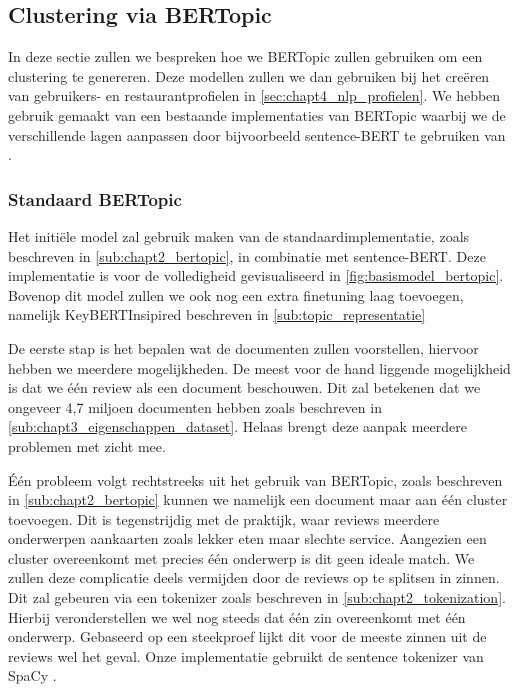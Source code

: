 
\subsection{Clustering via BERTopic}
In deze sectie zullen we bespreken hoe we BERTopic zullen gebruiken om een clustering te genereren. Deze modellen zullen we dan gebruiken bij het creëren van gebruikers- en restaurantprofielen in \autoref{sec:chapt4_nlp_profielen}. We hebben gebruik gemaakt van een bestaande implementaties van BERTopic \cite{bertopic_homepage} waarbij we de verschillende lagen aanpassen door bijvoorbeeld sentence-BERT te gebruiken van \cite{sentence_transformers_implementation}. 

\subsubsection{Standaard BERTopic}
Het initiële model zal gebruik maken van de standaardimplementatie, zoals beschreven in \autoref{sub:chapt2_bertopic}, in combinatie met sentence-BERT. Deze implementatie is voor de volledigheid gevisualiseerd in \autoref{fig:basismodel_bertopic}. Bovenop dit model zullen we ook nog een extra finetuning laag toevoegen, namelijk KeyBERTInsipired beschreven in \autoref{sub:topic_representatie}


De eerste stap is het bepalen wat de documenten zullen voorstellen, hiervoor hebben we meerdere mogelijkheden. De meest voor de hand liggende mogelijkheid is dat we één review als een document beschouwen. Dit zal betekenen dat we ongeveer 4,7 miljoen documenten hebben zoals beschreven in \autoref{sub:chapt3_eigenschappen_dataset}. Helaas brengt deze aanpak meerdere problemen met zicht mee. 

Één probleem volgt rechtstreeks uit het gebruik van BERTopic, zoals beschreven in \autoref{sub:chapt2_bertopic} kunnen we namelijk een document maar aan één cluster toevoegen. Dit is tegenstrijdig met de praktijk, waar reviews meerdere onderwerpen aankaarten zoals lekker eten maar slechte service. Aangezien een cluster overeenkomt met precies één onderwerp is dit geen ideale match. We zullen deze complicatie deels vermijden door de reviews op te splitsen in zinnen. Dit zal gebeuren via een tokenizer zoals beschreven in \autoref{sub:chapt2_tokenization}. Hierbij veronderstellen we wel nog steeds dat één zin overeenkomt met één onderwerp. Gebaseerd op een steekproef lijkt dit voor de meeste zinnen uit de reviews wel het geval. Onze implementatie gebruikt de sentence tokenizer van SpaCy \cite{spacy_main}.


